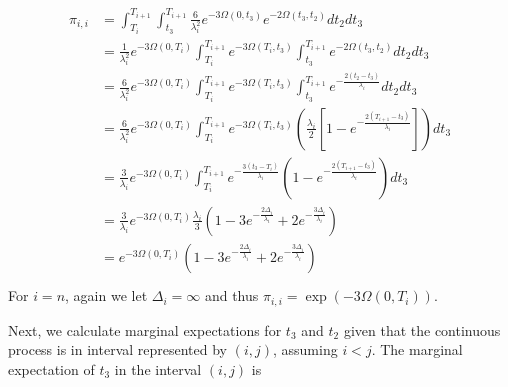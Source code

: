 \documentclass{article}
\begin{document}
\begin{align}
    \begin{split}
    \pi_{i,i} &= \int_{T_i}^{T_{i+1}}\int_{t_3}^{T_{i+1}}
    \frac{6}{\lambda_i^2}e^{-3\Omega(0,t_3)}e^{-2\Omega(t_3,t_2)}dt_2dt_3\\
    &= \frac{1}{\lambda_i^2}e^{-3\Omega(0,T_i)}\int_{T_i}^{T_{i+1}}
    e^{-3\Omega(T_i,t_3)}\int_{t_3}^{T_{i+1}}e^{-2\Omega(t_3,t_2)}dt_2dt_3\\
    &= \frac{6}{\lambda_i^2}e^{-3\Omega(0,T_i)}\int_{T_i}^{T_{i+1}}
    e^{-3\Omega(T_i,t_3)}\int_{t_3}^{T_{i+1}}e^{-\frac{2(t_2-t_3)}{\lambda_i}}dt_2dt_3\\
    &= \frac{6}{\lambda_i^2}e^{-3\Omega(0,T_i)}\int_{T_i}^{T_{i+1}}
    e^{-3\Omega(T_i,t_3)}\left(\frac{\lambda_i}{2}\left[1-e^{-\frac{2(T_{i+1}-t_3)}{\lambda_i}}\right]\right)dt_3\\
    &= \frac{3}{\lambda_i}e^{-3\Omega(0,T_i)}\int_{T_i}^{T_{i+1}}
    e^{-\frac{3(t_3-T_i)}{\lambda_i}}\left(1-e^{-\frac{2(T_{i+1}-t_3)}{\lambda_i}}\right)dt_3\\
    &= \frac{3}{\lambda_i}e^{-3\Omega(0,T_i)}
    \frac{\lambda_i}{3}\left(1-3e^{-\frac{2\Delta_i}{\lambda_i}}+2e^{-\frac{3\Delta_i}{\lambda_i}}\right)\\
    &= e^{-3\Omega(0,T_i)}
    \left(1-3e^{-\frac{2\Delta_i}{\lambda_i}}+2e^{-\frac{3\Delta_i}{\lambda_i}}\right)\\
    \end{split}
\end{align}
For $i = n$, again we let $\Delta_i = \infty$ and thus $\pi_{i,i} = \exp(-3\Omega(0,T_i))$.

Next, we calculate marginal expectations for $t_3$ and $t_2$ given that the
continuous process is in interval represented by $(i,j)$, assuming $i<j$. The
marginal expectation of $t_3$ in the interval $(i,j)$ is 
\end{document}
